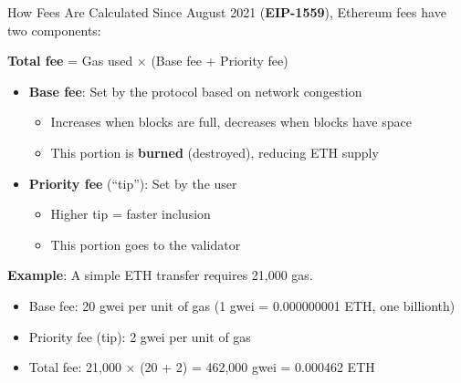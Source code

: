 \documentclass[10pt]{beamer}
\newcommand{\highlight}[1]{\textcolor{AccentOrange}{\textbf{#1}}}
\begin{document}
\begin{frame}{How Fees Are Calculated}
  Since August 2021 (\highlight{EIP-1559}), Ethereum fees have two components:
  
  \vspace{1em}
  \textbf{Total fee} = Gas used $\times$ (Base fee + Priority fee)
  
  \vspace{1em}
  \begin{itemize}
    \item \textbf{Base fee}: Set by the protocol based on network congestion
    \begin{itemize}
      \item Increases when blocks are full, decreases when blocks have space
      \item This portion is \highlight{burned} (destroyed), reducing ETH supply
    \end{itemize}
    
    \vspace{0.5em}
    \item \textbf{Priority fee} (``tip''): Set by the user
    \begin{itemize}
      \item Higher tip = faster inclusion
      \item This portion goes to the validator
    \end{itemize}
  \end{itemize}

\vspace{1em}
\textbf{Example}: A simple ETH transfer requires 21,000 gas.
\begin{itemize}
  \item Base fee: 20 gwei per unit of gas (1 gwei = 0.000000001 ETH, one billionth)
  \item Priority fee (tip): 2 gwei per unit of gas
  \item Total fee: 21,000 $\times$ (20 + 2) = 462,000 gwei = 0.000462 ETH
\end{itemize}
\end{frame}
\end{document}
